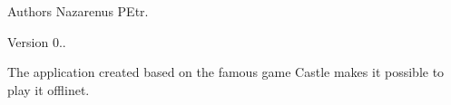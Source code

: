 \begin{DoxyAuthor}{Authors}
Nazarenus P\+Etr. 
\end{DoxyAuthor}
\begin{DoxyVersion}{Version}
0..
\end{DoxyVersion}
The application created based on the famous game Castle makes it possible to play it offlinet. 